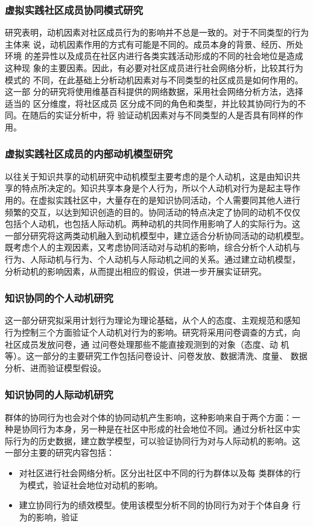 \documentclass[12pt,a4paper,cs4size]{ctexart}
\begin{document}
\subsubsection{虚拟实践社区成员协同模式研究}
研究表明，动机因素对社区成员行为的影响并不总是一致的。对于不同类型的行为主体来
说，动机因素作用的方式有可能是不同的。成员本身的背景、经历、所处环境
的差异性以及成员在社区内进行各类实践活动形成的不同的社会地位是造成这种现
象的主要因素。因此，有必要对社区成员进行社会网络分析，比较其行为模式的
不同，在此基础上分析动机因素对与不同类型的社区成员是如何作用的。这一部
分的研究将使用维基百科提供的网络数据，采用社会网络分析方法，选择适当的
区分维度，将社区成员
区分成不同的角色和类型，并比较其协同行为的不同。在随后的实证分析中，将
验证动机因素对与不同类型的人是否具有同样的作用。

\subsubsection{虚拟实践社区成员的内部动机模型研究}
以往关于知识共享的动机研究中动机模型主要考虑的是个人动机，这是由知识共
享的特点所决定的。知识共享本身是个人行为，所以个人动机对行为是起主导作
用的。在虚拟实践社区中，大量存在的是知识协同活动，个人需要同其他人进行
频繁的交互，以达到知识创造的目的。协同活动的特点决定了协同的动机不仅仅
包括个人动机，也包括人际动机。两种动机的共同作用影响了人的实际行为。这
一部分研究将这两类动机融入到动机模型中，建立适合分析协同活动的动机模型。
既考虑个人的主观因素，又考虑协同活动对与动机的影响，综合分析个人动机与
行为、人际动机与行为、个人动机与人际动机之间的关系。通过建立动机模型，
分析动机的影响因素，从而提出相应的假设，供进一步开展实证研究。


\subsubsection{知识协同的个人动机研究}
这一部分研究拟采用计划行为理论为理论基础，从个人的态度、主观规范和感知
行为控制三个方面验证个人动机对行为的影响。研究将采用问卷调查的方式，向
社区成员发放问卷，通
过问卷处理那些不能直接观测到的对象（态度、动
机等）。这一部分的主要研究工作包括问卷设计、问卷发放、数据清洗、度量、
数据分析、进而验证模型假设。

\subsubsection{知识协同的人际动机研究}
群体的协同行为也会对个体的协同动机产生影响，这种影响来自于两个方面：一
种是协同行为本身，另一种是在社区中形成的社会地位不同。通过分析社区中实
际行为的历史数据，建立数学模型，可以验证协同行为对与人际动机的影响。这
一部分主要的研究内容包括：
\begin{itemize}
\item 对社区进行社会网络分析。区分出社区中不同的行为群体以及每
  类群体的行为模式，验证社会地位对动机的影响。
\item 建立协同行为的绩效模型。使用该模型分析不同的协同行为对于个体自身
  行为的影响，验证
\end{itemize}
\end{document}

